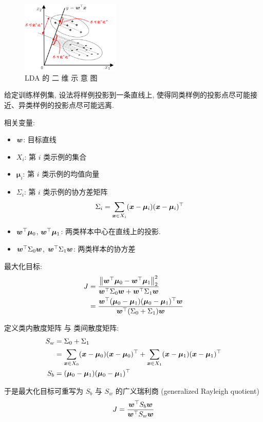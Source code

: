 \begin{figure}[!htb]
    \centering
    \includegraphics[width=0.42\textwidth]{pic/ML3/LDA.png}
    \caption{LDA 的 二 维 示 意 图}
\end{figure}
给定训练样例集, 设法将样例投影到一条直线上, 使得同类样例的投影点尽可能接近、异类样例的投影点尽可能远离. 

相关变量:
\begin{itemize}
    \item $\bm{w}$: 目标直线
    \item $X_i$: 第 $i$ 类示例的集合
    \item $\bm{\mu}_i$: 第 $i$ 类示例的均值向量
    \item $\Sigma_i$: 第 $i$ 类示例的协方差矩阵
    \begin{align*}
        \Sigma_i=\sum_{\bm{x}\in X_i}(\bm{x}-\bm{\mu}_i)(\bm{x}-\bm{\mu}_i)^\top
    \end{align*}
    \item $\bm{w}^\top\bm{\mu}_0$, $\bm{w}^\top\bm{\mu}_1$: 两类样本中心在直线上的投影.
    \item $\bm{w}^\top\Sigma_0\bm{w}$, $\bm{w}^\top\Sigma_1\bm{w}$: 两类样本的协方差
\end{itemize}

最大化目标:
\begin{align*}
    J&=\frac{\left\lVert\bm{w}^\top\bm{\mu}_0-\bm{w}^\top\bm{\mu}_1\right\rVert_2^2}{\bm{w}^\top\Sigma_0\bm{w}+\bm{w}^\top\Sigma_1\bm{w}}\\
    &=\frac{\bm{w}^\top(\bm{\mu}_0-\bm{\mu}_1)(\bm{\mu}_0-\bm{\mu}_1)^\top\bm{w}}{\bm{w}^\top(\Sigma_0+\Sigma_1)\bm{w}}
\end{align*}

定义类内散度矩阵 与 类间散度矩阵:
\begin{align*}
    S_w&=\Sigma_0+\Sigma_1\\
    &=\sum_{\bm{x}\in X_0}(\bm{x}-\bm{\mu}_0)(\bm{x}-\bm{\mu}_0)^\top+\sum_{\bm{x}\in X_1}(\bm{x}-\bm{\mu}_1)(\bm{x}-\bm{\mu}_1)^\top\\
    S_b&=(\bm{\mu}_0-\bm{\mu}_1)(\bm{\mu}_0-\bm{\mu}_1)^\top
\end{align*}


于是最大化目标可重写为 $S_b$ 与 $S_w$ 的广义瑞利商 (generalized Rayleigh quotient)
\begin{align*}
    J=\frac{\bm{w}^\top S_b \bm{w}}{\bm{w}^\top S_w \bm{w}}
\end{align*}


